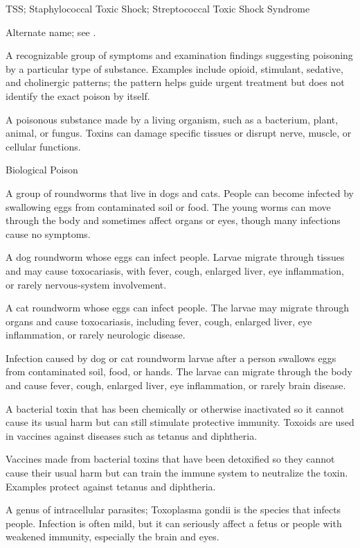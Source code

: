 \synonyms
TSS; Staphylococcal Toxic Shock; Streptococcal Toxic Shock Syndrome

 Alternate name; see .

 A recognizable group of symptoms and examination findings suggesting poisoning by a particular type of substance. Examples include opioid, stimulant, sedative, and cholinergic patterns; the pattern helps guide urgent treatment but does not identify the exact poison by itself.

 A poisonous substance made by a living organism, such as a bacterium, plant, animal, or fungus. Toxins can damage specific tissues or disrupt nerve, muscle, or cellular functions.

\synonyms
Biological Poison

 A group of roundworms that live in dogs and cats. People can become infected by swallowing eggs from contaminated soil or food. The young worms can move through the body and sometimes affect organs or eyes, though many infections cause no symptoms.

 A dog roundworm whose eggs can infect people. Larvae migrate through tissues and may cause toxocariasis, with fever, cough, enlarged liver, eye inflammation, or rarely nervous-system involvement.

 A cat roundworm whose eggs can infect people. The larvae may migrate through organs and cause toxocariasis, including fever, cough, enlarged liver, eye inflammation, or rarely neurologic disease.

 Infection caused by dog or cat roundworm larvae after a person swallows eggs from contaminated soil, food, or hands. The larvae can migrate through the body and cause fever, cough, enlarged liver, eye inflammation, or rarely brain disease.

 A bacterial toxin that has been chemically or otherwise inactivated so it cannot cause its usual harm but can still stimulate protective immunity. Toxoids are used in vaccines against diseases such as tetanus and diphtheria.

 Vaccines made from bacterial toxins that have been detoxified so they cannot cause their usual harm but can train the immune system to neutralize the toxin. Examples protect against tetanus and diphtheria.

 A genus of intracellular parasites; Toxoplasma gondii is the species that infects people. Infection is often mild, but it can seriously affect a fetus or people with weakened immunity, especially the brain and eyes.

